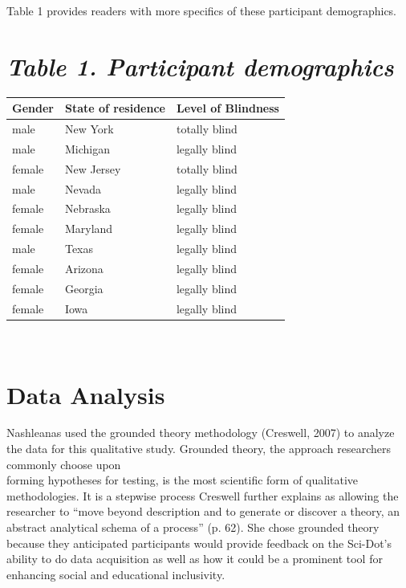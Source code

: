 \documentclass[11.5pt]{sig-alternate}
\begin{document}
\begin{large}
Table 1 provides readers with more specifics of these participant demographics.

\section*{\textit{ Table 1. Participant demographics}}

\begin{tabular}{ | m{3em} | m{3cm}| m{3cm}|}
 \hline
Gender & State of \newline residence & Level of \newline Blindness \\ 
 \hline
 male & New York & totally blind \\ 
 \hline
 male & Michigan & legally blind \\ 
 \hline
 female & New Jersey & totally blind \\ 
 \hline
 male & Nevada & legally blind \\ 
 \hline
female & Nebraska & legally blind \\ 
 \hline
female & Maryland & legally blind \\ 
 \hline
 male & Texas & legally blind \\ 
 \hline
 female & Arizona & legally blind \\ 
 \hline
 female & Georgia & legally blind \\ 
 \hline
female & Iowa & legally blind \\ 
\hline
\end{tabular}\\

\section*{Data Analysis}

Nashleanas used the grounded theory methodology (Creswell, 2007) to analyze the data for this qualitative study. Grounded theory, the approach researchers commonly choose upon \\forming hypotheses for testing, is the most scientific form of qualitative methodologies. It is a stepwise process Creswell further explains as allowing the researcher to “move beyond description and to generate or discover a theory, an abstract analytical schema of a process” (p. 62). She chose grounded theory because they anticipated participants would provide feedback on the Sci-Dot’s ability to do data acquisition as well as how it could be a prominent tool for enhancing social and educational inclusivity. 


\end{large}
\end{document}
